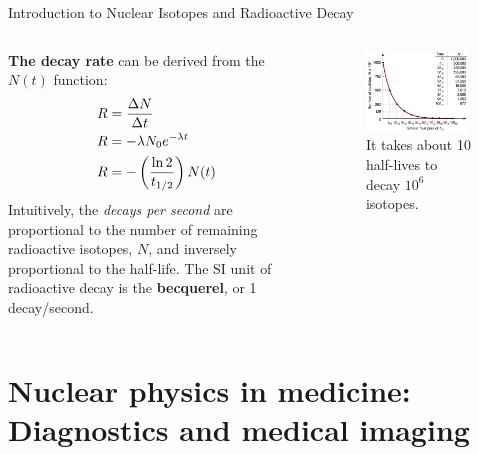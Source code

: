 \documentclass{beamer}
\begin{document}
\begin{frame}{Introduction to Nuclear Isotopes and Radioactive Decay}
\begin{columns}[T]
\begin{column}{0.5\textwidth}
\small
\textbf{\alert{The decay rate}} can be derived from the $N(t)$ function:
\begin{align}
R &= \frac{\Delta N}{\Delta t} \\
R &=-\lambda N_0 e^{-\lambda t} \\
R &= -\left(\frac{\ln 2}{t_{\rm 1/2}}\right)N(t)
\end{align}
Intuitively, the \textit{decays per second} are proportional to the number of remaining radioactive isotopes, $N$, and inversely proportional to the half-life.  The SI unit of radioactive decay is the \textbf{becquerel}, or 1 decay/second.
\end{column}
\begin{column}{0.5\textwidth}
\begin{figure}
\centering
\includegraphics[width=0.95\textwidth]{figures/half-life.png}
\caption{\label{fig:radio13} It takes about 10 half-lives to decay $10^6$ isotopes.}
\end{figure}
\end{column}
\end{columns}
\end{frame}

\section{Nuclear physics in medicine: Diagnostics and medical imaging}
\end{document}
